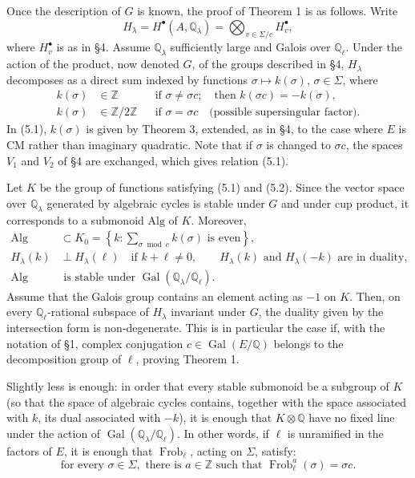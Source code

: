\documentclass[11pt]{article}
\newcommand{\Q}{\mathbb Q}
\newcommand{\Z}{\mathbb Z}
\newcommand{\Gal}{\operatorname{Gal}}
\theoremstyle{deligne}
\newcommand{\heading}[1]{\vspace{0.7em}\noindent{\bfseries #1}\quad}
\begin{document}
\heading{5.}
Once the description of $G$ is known, the proof of Theorem 1 is as follows. Write
\[
H_\lambda=H^\bullet(A,\Q_\lambda)=\bigotimes_{v\in\Sigma/c}H_v^\bullet,
\]
where $H_v^\bullet$ is as in \S4. Assume $\Q_\lambda$ sufficiently large and Galois over $\Q_\ell$. Under the action of the product, now denoted $G$, of the groups described in \S4, $H_\lambda$ decomposes as a direct sum indexed by functions $\sigma\mapsto k(\sigma)$, $\sigma\in\Sigma$, where
\begin{align}
\tag{5.1} k(\sigma)&\in\Z &&\text{if }\sigma\ne\sigma c;\quad\text{then }k(\sigma c)=-k(\sigma),\\
\tag{5.2} k(\sigma)&\in\Z/2\Z &&\text{if }\sigma=\sigma c\quad\text{(possible supersingular factor).}
\end{align}
In (5.1), $k(\sigma)$ is given by Theorem 3, extended, as in \S4, to the case where $E$ is CM rather than imaginary quadratic. Note that if $\sigma$ is changed to $\sigma c$, the spaces $V_1$ and $V_2$ of \S4 are exchanged, which gives relation (5.1).

Let $K$ be the group of functions satisfying (5.1) and (5.2). Since the vector space over $\Q_\lambda$ generated by algebraic cycles is stable under $G$ and under cup product, it corresponds to a submonoid $\mathrm{Alg}$ of $K$. Moreover,
\begin{align}
\tag{5.3} \mathrm{Alg}&\subset K_0=\left\{k:\sum_{\sigma\bmod c}k(\sigma)\text{ is even}\right\},\\
\tag{5.4} H_\lambda(k)&\perp H_\lambda(\ell)\quad\text{if }k+\ell\ne0,\qquad
H_\lambda(k)\text{ and }H_\lambda(-k)\text{ are in duality},\\
\tag{5.5} \mathrm{Alg}&\text{ is stable under }\Gal(\Q_\lambda/\Q_\ell).
\end{align}
Assume that the Galois group contains an element acting as $-1$ on $K$. Then, on every $\Q_\ell$-rational subspace of $H_\lambda$ invariant under $G$, the duality given by the intersection form is non-degenerate. This is in particular the case if, with the notation of \S1, complex conjugation $c\in\Gal(E/\Q)$ belongs to the decomposition group of $\ell$, proving Theorem 1.

Slightly less is enough: in order that every stable submonoid be a subgroup of $K$ (so that the space of algebraic cycles contains, together with the space associated with $k$, its dual associated with $-k$), it is enough that $K\otimes\Q$ have no fixed line under the action of $\Gal(\Q_\lambda/\Q_\ell)$. In other words, if $\ell$ is unramified in the factors of $E$, it is enough that $\operatorname{Frob}_\ell$, acting on $\Sigma$, satisfy:
\[
\text{for every }\sigma\in\Sigma,\text{ there is }a\in\Z\text{ such that }\operatorname{Frob}_\ell^a(\sigma)=\sigma c.
\]
\end{document}
